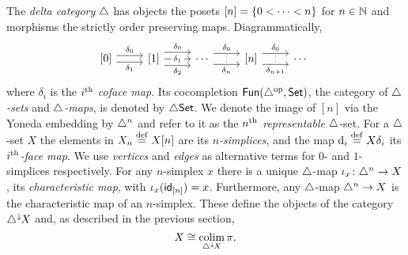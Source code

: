 The \textit{delta category} $\triangle$ has objects the posets $[n] = \{0 < \dots < n\}$ for $n \in \mathbb{N}$ and morphisms the strictly order preserving maps.
Diagrammatically,
\[
\begin{tikzcd}
	{[0]} \arrow[r,shift left=3pt, "\delta_0"] \arrow[r,shift right=3pt, "\delta_1"'] &
	{[1]} \arrow[r,shift left=6pt, "\delta_0"] \arrow[r, "\delta_1"' description] \arrow[r,shift right=6pt, "\delta_2"'] &
	\dotsb
	\arrow[r,shift left=5pt, "\delta_0"] \arrow[r,shift right=5pt, "\delta_n"', "\scalebox{0.6}{$\vdots$}"] &
	{[n]}
	\arrow[r,shift left=5pt, "\delta_0"] \arrow[r,shift right=5pt, "\delta_{n+1}"', "\scalebox{0.6}{$\vdots$}"] &
	\dotsb \
\end{tikzcd}
\]
where $\delta_i$ is the $i^{\mathrm{th}}$ \textit{coface map}.
Its cocompletion $\mathsf{Fun}(\triangle^{\mathrm{op}}, \mathsf{Set})$, the category of \textit{$\triangle$-sets} and \textit{$\triangle$-maps}, is denoted by $\triangle\mathsf{Set}$.
We denote the image of $[n]$ via the Yoneda embedding by $\triangle^n$ and refer to it as the \textit{$n^{\mathrm{th}}$ representable} $\triangle$-set.
For a $\triangle$-set $X$ the elements in $X_n \stackrel{\mathrm{def}}{=} X[n]$ are its \textit{$n$-simplices}, and the map $\operatorname{d}_i \stackrel{\mathrm{def}}{=} X \delta_i$ its \textit{$i^{\mathrm{th}}$-face map}.
We use \textit{vertices} and \textit{edges} as alternative terms for $0$- and $1$-simplices respectively.
For any $n$-simplex $x$ there is a unique $\triangle$-map $\iota_x \colon \triangle^n \to X$, its \textit{characteristic map}, with $\iota_x(\mathsf{id}_{[n]}) = x$.
Furthermore, any $\triangle$-map $\triangle^n \to X$ is the characteristic map of an $n$-simplex.
These define the objects of the category $\triangle^\downarrow\hspace{-1pt}X$ and, as described in the previous section,
\[
X \cong \operatorname*{colim}_{\triangle^\downarrow\hspace{-1pt}X} \pi.
\]

